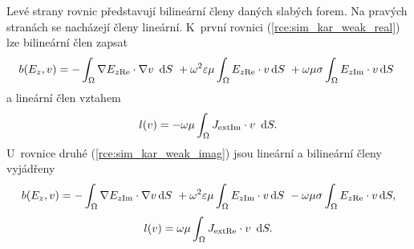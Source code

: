 Levé strany rovnic představují bilineární členy daných slabých forem. Na pravých stranách se nacházejí členy lineární. K~první rovnici (\ref{rce:sim_kar_weak_real}) lze bilineární člen zapsat
\begin{equation}
	b(E_{z},v) = -\int_{\Omega}\nabla E_{z\mathrm{Re}}\cdot\nabla v~\,\mathrm{d} S~+ \omega^{2}\varepsilon\mu\int_{\Omega} E_{z\mathrm{Re}}\cdot v\,\mathrm{d} S~+ \omega\mu\sigma\int_{\Omega} E_{z\mathrm{Im}}\cdot v\,\mathrm{d}
S~\label{rce:sim_kar_bilinear_real} 
\end{equation}
a lineární člen vztahem
\begin{equation}
	l(v) = - \omega\mu \int_{\Omega}J_{\mathrm{ext}\mathrm{Im}}\cdot v~\,\mathrm{d} S.
	\label{rce:sim_kar_linear_real}
\end{equation}
U~rovnice druhé (\ref{rce:sim_kar_weak_imag}) jsou lineární a bilineární členy vyjádřeny
\begin{equation}
	b(E_{z},v) = -\int_{\Omega}\nabla E_{z\mathrm{Im}}\cdot\nabla v\,\mathrm{d} S~+ \omega^{2}\varepsilon\mu\int_{\Omega} E_{z\mathrm{Im}}\cdot v\,\mathrm{d} S~- \omega\mu\sigma\int_{\Omega} E_{z\mathrm{Re}}\cdot v\,\mathrm{d} S,
	\label{rce:sim_kar_bilinear_imag}	
\end{equation}
\begin{equation}
	l(v) = \omega\mu \int_{\Omega}J_{\mathrm{ext}\mathrm{Re}}\cdot v~\,\mathrm{d} S.
	\label{rce:sim_kar_linear_imag}
\end{equation}

